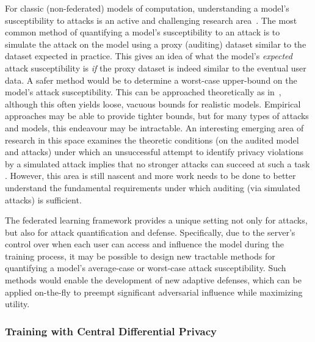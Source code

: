 \documentclass[11pt]{article}
\begin{document}
For classic (non-federated) models of computation, understanding a model's susceptibility to attacks is an active and challenging research area~\cite{fredrikson2015model, shokri2017membership, carlini2018secret, melis2018exploiting,carlini2020extracting}.
The most common method of quantifying a model's susceptibility to an attack is to simulate the attack on the model using a proxy (auditing) dataset similar to the dataset expected in practice.
This gives an idea of what the model's \textit{expected} attack susceptibility is \textit{if} the proxy dataset is indeed similar to the eventual user data. A safer method would be to determine a worst-case upper-bound on the model's attack susceptibility. This can be approached theoretically as in~\cite{yeom2018privacy}, although this often yields loose, vacuous bounds for realistic models. Empirical approaches may be able to provide tighter bounds, but for many types of attacks and models, this endeavour may be intractable. An interesting emerging area of research in this space examines the theoretic conditions (on the audited model and attacks) under which an unsuccessful attempt to identify privacy violations by a simulated attack implies that no stronger attacks can succeed at such a task \cite{diaz2019theoretical}. However, this area is still nascent and more work needs to be done to better understand the fundamental requirements under which auditing (via simulated attacks) is sufficient.

The federated learning framework provides a unique setting not only for attacks, but also for attack quantification and defense. Specifically, due to the server's control over when each user can access and influence the model during the training process, it may be possible to design new tractable methods for quantifying a model's average-case or worst-case attack susceptibility. Such methods would enable the development of new adaptive defenses, which can be applied on-the-fly to preempt significant adversarial influence while maximizing utility.

\subsubsection{Training with Central Differential Privacy}
\label{sssec:central_dp}
\end{document}
